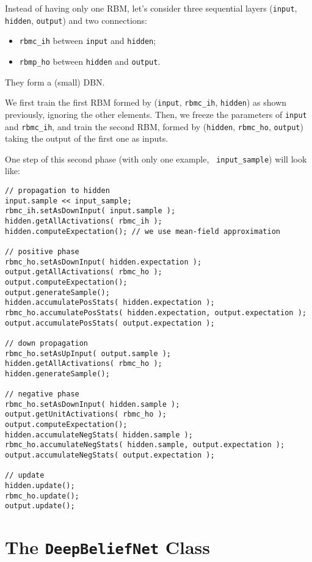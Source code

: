 \documentclass[11pt]{book}
\begin{document}
Instead of having only one RBM, let's consider three sequential layers
({\tt input}, {\tt hidden}, {\tt output}) and two connections:

\begin{itemize}
    \item {\tt rbmc\_ih} between {\tt input} and {\tt hidden};
    \item {\tt rbmp\_ho} between {\tt hidden} and {\tt output}.
\end{itemize}
They form a (small) DBN.

We first train the first RBM formed by ({\tt input}, {\tt rbmc\_ih},
{\tt hidden}) as shown previously, ignoring the other elements. Then,
we freeze the parameters of {\tt input} and {\tt rbmc\_ih}, and train
the second RBM, formed by ({\tt hidden}, {\tt rbmc\_ho}, {\tt output})
taking the output of the first one as inputs.

One step of this second phase (with only one example, {\tt
input\_sample}) will look like:

\begin{verbatim}
// propagation to hidden
input.sample << input_sample;
rbmc_ih.setAsDownInput( input.sample );
hidden.getAllActivations( rbmc_ih );
hidden.computeExpectation(); // we use mean-field approximation

// positive phase
rbmc_ho.setAsDownInput( hidden.expectation );
output.getAllActivations( rbmc_ho );
output.computeExpectation();
output.generateSample();
hidden.accumulatePosStats( hidden.expectation );
rbmc_ho.accumulatePosStats( hidden.expectation, output.expectation );
output.accumulatePosStats( output.expectation );

// down propagation
rbmc_ho.setAsUpInput( output.sample );
hidden.getAllActivations( rbmc_ho );
hidden.generateSample();

// negative phase
rbmc_ho.setAsDownInput( hidden.sample );
output.getUnitActivations( rbmc_ho );
output.computeExpectation();
hidden.accumulateNegStats( hidden.sample );
rbmc_ho.accumulateNegStats( hidden.sample, output.expectation );
output.accumulateNegStats( output.expectation );

// update
hidden.update();
rbmc_ho.update();
output.update();
\end{verbatim}

\section{The {\tt DeepBeliefNet} Class}
\label{DeepBeliefNet}
\end{document}
